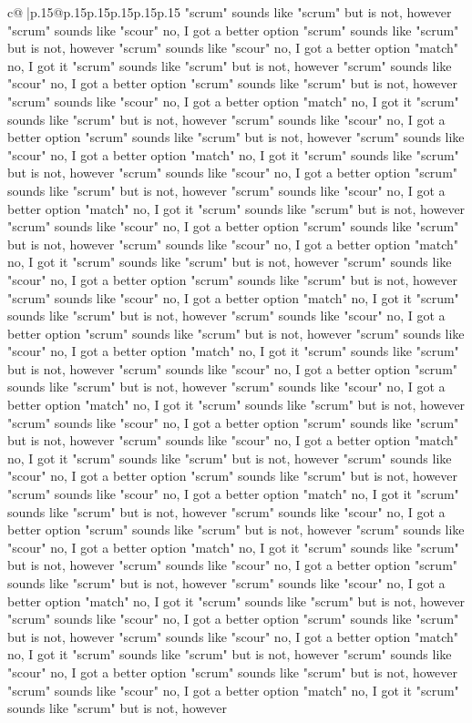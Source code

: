 \documentclass{article}
\begin{document}
{\begin{supertabular}{c@{$\;$}|p{.15\linewidth}@{}p{.15\linewidth}p{.15\linewidth}p{.15\linewidth}p{.15\linewidth}p{.15\linewidth}}
{{{"scrum" sounds like "scrum" but is not, however "scrum" sounds like "scour" no, I got a better option "scrum" sounds like "scrum" but is not, however "scrum" sounds like "scour" no, I got a better option "match" no, I got it "scrum" sounds like "scrum" but is not, however "scrum" sounds like "scour" no, I got a better option "scrum" sounds like "scrum" but is not, however "scrum" sounds like "scour" no, I got a better option "match" no, I got it "scrum" sounds like "scrum" but is not, however "scrum" sounds like "scour" no, I got a better option "scrum" sounds like "scrum" but is not, however "scrum" sounds like "scour" no, I got a better option "match" no, I got it "scrum" sounds like "scrum" but is not, however "scrum" sounds like "scour" no, I got a better option "scrum" sounds like "scrum" but is not, however "scrum" sounds like "scour" no, I got a better option "match" no, I got it "scrum" sounds like "scrum" but is not, however "scrum" sounds like "scour" no, I got a better option "scrum" sounds like "scrum" but is not, however "scrum" sounds like "scour" no, I got a better option "match" no, I got it "scrum" sounds like "scrum" but is not, however "scrum" sounds like "scour" no, I got a better option "scrum" sounds like "scrum" but is not, however "scrum" sounds like "scour" no, I got a better option "match" no, I got it "scrum" sounds like "scrum" but is not, however "scrum" sounds like "scour" no, I got a better option "scrum" sounds like "scrum" but is not, however "scrum" sounds like "scour" no, I got a better option "match" no, I got it "scrum" sounds like "scrum" but is not, however "scrum" sounds like "scour" no, I got a better option "scrum" sounds like "scrum" but is not, however "scrum" sounds like "scour" no, I got a better option "match" no, I got it "scrum" sounds like "scrum" but is not, however "scrum" sounds like "scour" no, I got a better option "scrum" sounds like "scrum" but is not, however "scrum" sounds like "scour" no, I got a better option "match" no, I got it "scrum" sounds like "scrum" but is not, however "scrum" sounds like "scour" no, I got a better option "scrum" sounds like "scrum" but is not, however "scrum" sounds like "scour" no, I got a better option "match" no, I got it "scrum" sounds like "scrum" but is not, however "scrum" sounds like "scour" no, I got a better option "scrum" sounds like "scrum" but is not, however "scrum" sounds like "scour" no, I got a better option "match" no, I got it "scrum" sounds like "scrum" but is not, however "scrum" sounds like "scour" no, I got a better option "scrum" sounds like "scrum" but is not, however "scrum" sounds like "scour" no, I got a better option "match" no, I got it "scrum" sounds like "scrum" but is not, however "scrum" sounds like "scour" no, I got a better option "scrum" sounds like "scrum" but is not, however "scrum" sounds like "scour" no, I got a better option "match" no, I got it "scrum" sounds like "scrum" but is not, however "scrum" sounds like "scour" no, I got a better option "scrum" sounds like "scrum" but is not, however "scrum" sounds like "scour" no, I got a better option "match" no, I got it "scrum" sounds like "scrum" but is not, however }}}
\end{supertabular}}
\end{document}
